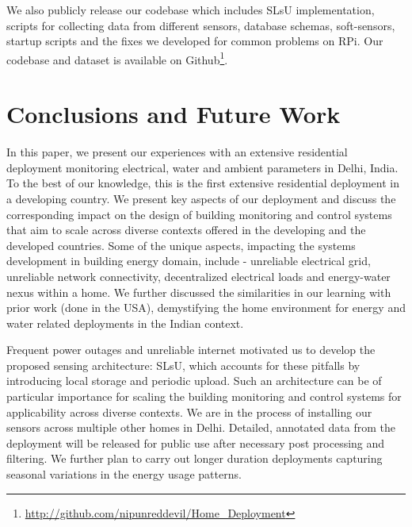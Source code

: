 \documentclass[10pt]{sensys-proc}
\newcommand{\selstup}{SLsU}
\newcommand{\selstups}{SLsU }
\begin{document}
We also publicly release our codebase which includes \selstups implementation, scripts for collecting data from different sensors, database schemas, soft-sensors, startup scripts and the fixes we developed for common problems on RPi. Our codebase and dataset is available on Github\footnote{\url{http://github.com/nipunreddevil/Home_Deployment}}.

\vspace{-1mm}
\section{Conclusions and Future Work}
 In this paper, we present our experiences with an extensive residential deployment monitoring electrical, water and ambient parameters in Delhi, India. To the best of our knowledge, this is the first extensive residential deployment in a developing country. We present key aspects of our deployment and discuss the corresponding impact on the design of building monitoring and control systems that aim to scale across diverse contexts offered in the developing and the developed countries. Some of the unique aspects, impacting the systems development in building energy domain, include - unreliable electrical grid, unreliable network connectivity, decentralized electrical loads and energy-water nexus within a home. We further discussed the similarities in our learning with prior work (done in the USA), demystifying the home environment for energy and water related deployments in the Indian context. %

Frequent power outages and unreliable internet motivated us to develop the proposed sensing architecture: \selstup, which accounts for these pitfalls by introducing local storage and periodic upload. Such an architecture can be of particular importance for scaling the building monitoring and control systems for applicability across diverse contexts. %
We are in the process of installing our sensors across multiple other homes in Delhi. Detailed, annotated data from the deployment will be released for public use after necessary post processing and filtering. We further plan to carry out longer duration deployments capturing seasonal variations in the energy usage patterns. %

\balance

 
\end{document}
